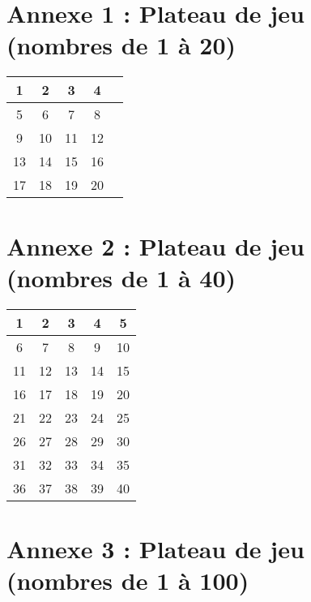 \newpage

\section*{Annexe 1 : Plateau de jeu (nombres de 1 à 20)}

\begin{center}
\begin{tabular}{|c|c|c|c|c|}
\hline
1 & 2 & 3 & 4 \\
\hline
5 & 6 & 7 & 8 \\
\hline
9 & 10 & 11 & 12 \\
\hline
13 & 14 & 15 & 16 \\
\hline
17 & 18 & 19 & 20 \\
\hline
\end{tabular}
\end{center}

\newpage

\section*{Annexe 2 : Plateau de jeu (nombres de 1 à 40)}

\begin{center}
\begin{tabular}{|c|c|c|c|c|}
\hline
1 & 2 & 3 & 4 & 5 \\
\hline
6 & 7 & 8 & 9 & 10 \\
\hline
11 & 12 & 13 & 14 & 15 \\
\hline
16 & 17 & 18 & 19 & 20 \\
\hline
21 & 22 & 23 & 24 & 25 \\
\hline
26 & 27 & 28 & 29 & 30 \\
\hline
31 & 32 & 33 & 34 & 35 \\
\hline
36 & 37 & 38 & 39 & 40 \\
\hline
\end{tabular}
\end{center}

\newpage

\section*{Annexe 3 : Plateau de jeu (nombres de 1 à 100)}

